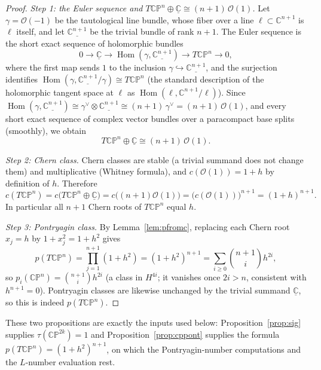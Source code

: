 \documentclass[12pt]{article}
\theoremstyle{definition}
\begin{document}
\begin{proof}
\emph{Step 1: the Euler sequence and $T\mathbb{CP}^n\oplus\underline{\mathbb{C}}\cong
(n+1)\,\mathcal{O}(1)$.}
Let $\gamma=\mathcal{O}(-1)$ be the tautological line bundle, whose fiber over a line
$\ell\subset\mathbb{C}^{n+1}$ is $\ell$ itself, and let $\underline{\mathbb{C}^{n+1}}$ be
the trivial bundle of rank $n+1$.  The Euler sequence is the short exact sequence of
holomorphic bundles
\[
0\longrightarrow \underline{\mathbb{C}}\longrightarrow
\operatorname{Hom}(\gamma,\underline{\mathbb{C}^{n+1}})
\longrightarrow T\mathbb{CP}^n\longrightarrow 0,
\]
where the first map sends $1$ to the inclusion $\gamma\hookrightarrow
\underline{\mathbb{C}^{n+1}}$, and the surjection identifies
$\operatorname{Hom}(\gamma,\underline{\mathbb{C}^{n+1}}/\gamma)
\cong T\mathbb{CP}^n$ (the standard description of the holomorphic tangent space at $\ell$
as $\operatorname{Hom}(\ell,\mathbb{C}^{n+1}/\ell)$).  Since
$\operatorname{Hom}(\gamma,\underline{\mathbb{C}^{n+1}})\cong
\gamma^\vee\otimes\underline{\mathbb{C}^{n+1}}\cong (n+1)\,\gamma^\vee
=(n+1)\,\mathcal{O}(1)$, and every short exact sequence of complex vector bundles over a
paracompact base splits (smoothly), we obtain
\[
T\mathbb{CP}^n\oplus\underline{\mathbb{C}}\cong(n+1)\,\mathcal{O}(1).
\]

\emph{Step 2: Chern class.}  Chern classes are stable (a trivial summand does not change
them) and multiplicative (Whitney formula), and $c(\mathcal{O}(1))=1+h$ by definition of
$h$.  Therefore
\[
c(T\mathbb{CP}^n)=c\big(T\mathbb{CP}^n\oplus\underline{\mathbb{C}}\big)
=c\big((n+1)\mathcal{O}(1)\big)=\big(c(\mathcal{O}(1))\big)^{n+1}=(1+h)^{n+1}.
\]
In particular all $n+1$ Chern roots of $T\mathbb{CP}^n$ equal $h$.

\emph{Step 3: Pontryagin class.}  By Lemma~\ref{lem:pfromc}, replacing each Chern root
$x_j=h$ by $1+x_j^2=1+h^2$ gives
\[
p(T\mathbb{CP}^n)=\prod_{j=1}^{n+1}(1+h^2)=(1+h^2)^{n+1}
=\sum_{i\ge0}\binom{n+1}{i}h^{2i},
\]
so $p_i(\mathbb{CP}^n)=\binom{n+1}{i}h^{2i}$ (a class in $H^{4i}$; it vanishes once
$2i>n$, consistent with $h^{n+1}=0$).  Pontryagin classes are likewise unchanged by the
trivial summand $\underline{\mathbb{C}}$, so this is indeed $p(T\mathbb{CP}^n)$.
\end{proof}

These two propositions are exactly the inputs used below: Proposition~\ref{prop:sig}
supplies $\tau(\mathbb{CP}^{2k})=1$ and Proposition~\ref{prop:cppont} supplies the formula
$p(T\mathbb{CP}^n)=(1+h^2)^{n+1}$, on which the Pontryagin-number computations and the
$L$-number evaluation rest.
\end{document}

